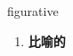 
\begin{frame}
{\huge figurative}
\begin{center}
\begin{enumerate}\Large
  \item \textbf{比喻的}
\end{enumerate}
\end{center}
\end{frame}
